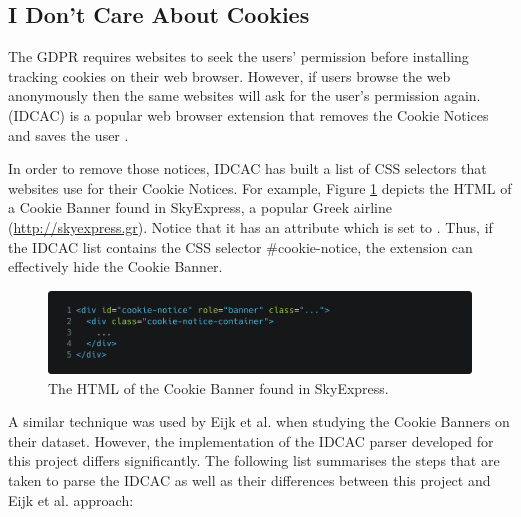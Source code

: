 \documentclass[../main.tex]{subfiles}
\begin{document}
\subsection{I Don't Care About Cookies}

The GDPR requires websites to seek the users’ permission before installing tracking cookies on their web browser. However, if users browse the web anonymously then the same websites will ask for the user’s permission again.  (IDCAC) is a popular web browser extension that removes the Cookie Notices and saves the user  \cite{kladnik}. 

In order to remove those notices, IDCAC has built a list of CSS selectors that websites use for their Cookie Notices. For example, Figure \ref{fig:design_skyexpress} depicts the HTML of a Cookie Banner found in SkyExpress, a popular Greek airline (\url{http://skyexpress.gr}). Notice that it has an  attribute which is set to . Thus, if the IDCAC list contains the CSS selector {\selectfont \#cookie-notice}, the extension can effectively hide the Cookie Banner.

\begin{figure}[ht]
    \centering
    \includegraphics[width=\textwidth]{images/implementation/skyexpress.png}
    \caption{The HTML of the Cookie Banner found in SkyExpress.}
    \label{fig:design_skyexpress}
\end{figure}

A similar technique was used by Eijk et al. when studying the Cookie Banners on their dataset. However, the implementation of the IDCAC parser developed for this project differs significantly. The following list summarises the steps that are taken to parse the IDCAC as well as their differences between this project and Eijk et al. approach:
\end{document}
